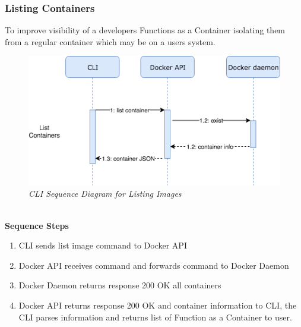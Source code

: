 \subsubsection{Listing Containers}
To improve visibility of a developers Functions as a Container isolating them from a regular container which may be on a users system.
\begin{figure}[!ht]
\centering
\includegraphics*[width=1\textwidth]{images/sec-list-con.png}
\caption{\em CLI Sequence Diagram for Listing Images}
\label{img:cli_seq6}
\end{figure}
\\\textbf{Sequence Steps}
\begin{enumerate}
  \item CLI sends list image command to Docker API
  \item Docker API receives command and forwards command to Docker Daemon
  \item Docker Daemon returns response 200 OK all containers
  \item Docker API returns response 200 OK and container information to CLI, the CLI parses information and returns list of Function as a Container to user.
\end{enumerate}
\clearpage


